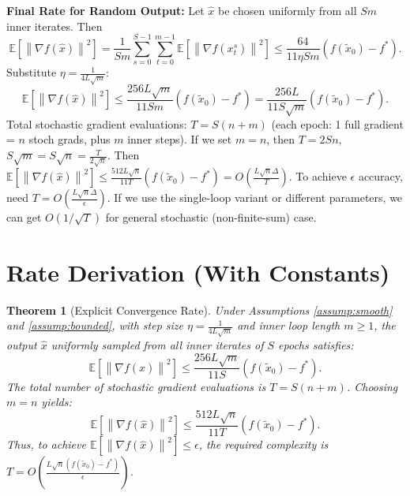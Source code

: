 \documentclass{article}
\newtheorem{theorem}{Theorem}
\newcommand{\E}{\mathbb{E}}
\newcommand{\norm}[1]{\left\| #1 \right\|}
\newcommand{\grad}{\nabla}
\newcommand{\step}[1]{\text{\color{blue}[Step #1]}}
\begin{document}
\step{22} \textbf{Final Rate for Random Output:}
Let $\hat{x}$ be chosen uniformly from all $S m$ inner iterates. Then
\begin{equation}
    \E[\norm{\grad f(\hat{x})}^2] = \frac{1}{S m} \sum_{s=0}^{S-1} \sum_{t=0}^{m-1} \E[\norm{\grad f(x_t^s)}^2] \le \frac{64}{11 \eta S m} (f(\tilde{x}_0) - f^*).
\end{equation}
Substitute $\eta = \frac{1}{4 L \sqrt{m}}$:
\begin{equation}
    \E[\norm{\grad f(\hat{x})}^2] \le \frac{256 L \sqrt{m}}{11 S m} (f(\tilde{x}_0) - f^*) = \frac{256 L}{11 S \sqrt{m}} (f(\tilde{x}_0) - f^*).
\end{equation}
Total stochastic gradient evaluations: $T = S (n + m)$ (each epoch: 1 full gradient = $n$ stoch grads, plus $m$ inner steps). If we set $m = n$, then $T = 2 S n$, $S \sqrt{m} = S \sqrt{n} = \frac{T}{2\sqrt{n}}$.
Then $\E[\norm{\grad f(\hat{x})}^2] \le \frac{512 L \sqrt{n}}{11 T} (f(\tilde{x}_0) - f^*) = O\left( \frac{L \sqrt{n} \Delta}{T} \right)$.
To achieve $\epsilon$ accuracy, need $T = O\left( \frac{L \sqrt{n} \Delta}{\epsilon} \right)$.
If we use the single-loop variant or different parameters, we can get $O(1/\sqrt{T})$ for general stochastic (non-finite-sum) case.

\section*{Rate Derivation (With Constants)}

\begin{theorem}[Explicit Convergence Rate]
Under Assumptions \ref{assump:smooth} and \ref{assump:bounded}, with step size $\eta = \frac{1}{4 L \sqrt{m}}$ and inner loop length $m \ge 1$, the output $\hat{x}$ uniformly sampled from all inner iterates of $S$ epochs satisfies:
\begin{equation}
    \E\left[ \norm{\grad f(\hat{x})}^2 \right] \le \frac{256 L \sqrt{m}}{11 S} \left( f(\tilde{x}_0) - f^* \right).
\end{equation}
The total number of stochastic gradient evaluations is $T = S(n + m)$. Choosing $m = n$ yields:
\begin{equation}
    \E\left[ \norm{\grad f(\hat{x})}^2 \right] \le \frac{512 L \sqrt{n}}{11 T} \left( f(\tilde{x}_0) - f^* \right).
\end{equation}
Thus, to achieve $\E[\norm{\grad f(\hat{x})}^2] \le \epsilon$, the required complexity is $T = O\left( \frac{L \sqrt{n} (f(\tilde{x}_0)-f^*)}{\epsilon} \right)$.
\end{theorem}
\end{document}
